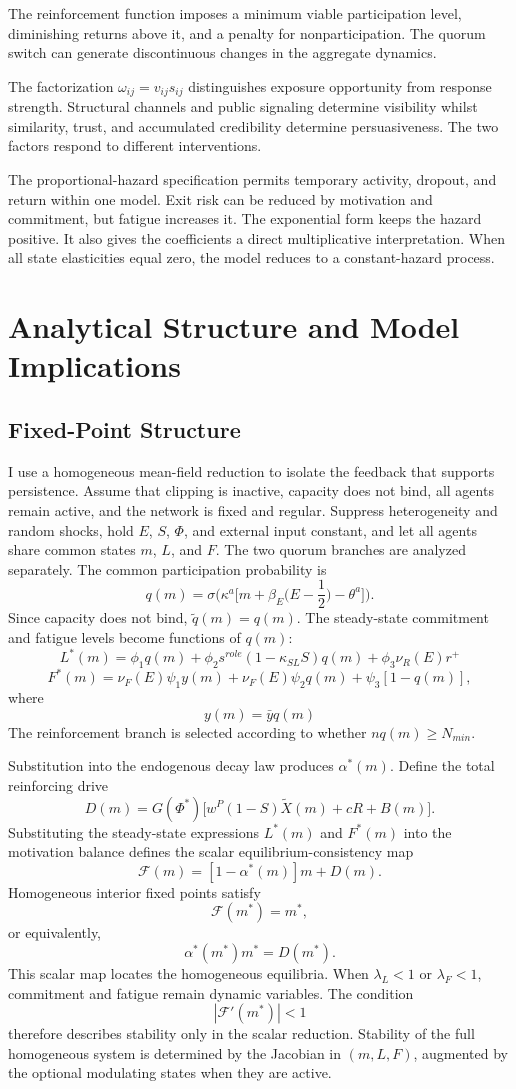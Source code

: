 \documentclass[11pt]{article}
\begin{document}
The reinforcement function imposes a minimum viable participation level, diminishing returns above it, and a penalty for nonparticipation.  The quorum switch can generate discontinuous changes in the aggregate dynamics. 

The factorization $\omega_{ij}=v_{ij}s_{ij}$ distinguishes exposure opportunity from response strength. Structural channels and public signaling determine visibility whilst similarity, trust, and accumulated credibility determine persuasiveness. The two factors respond to different interventions. 

The proportional-hazard specification permits temporary activity, dropout, and return within one model. Exit risk can be reduced by motivation and commitment, but fatigue increases it. The exponential form keeps the hazard positive. It also gives the coefficients a direct multiplicative interpretation. When all state elasticities equal zero, the model reduces to a constant-hazard process.

\section{Analytical Structure and Model Implications}
\subsection{Fixed-Point Structure}
I use a homogeneous mean-field reduction to isolate the feedback that supports persistence. Assume that clipping is inactive, capacity does not bind, all agents remain active, and the network is fixed and regular. Suppress heterogeneity and random shocks, hold $E$, $S$, $\Phi$, and external input constant, and let all agents share common states $m$, $L$, and $F$. The two quorum branches are analyzed separately. The common participation probability is 
\[
q(m)=\sigma\Bigg(\kappa^a\bigg[m+\beta_E\Big(E-\frac{1}{2}\Big)-\theta^a\bigg]\Bigg).
\]
Since capacity does not bind, $\tilde{q}(m)=q(m)$. The steady-state commitment and fatigue levels become functions of $q(m)$:
\[
L^*(m)=\phi_1q(m)+\phi_2s^{role}(1-\kappa_{SL}S)q(m)+\phi_3\nu_R(E)r^+
\]
\[
F^*(m)=\nu_F(E)\psi_1y(m)+\nu_F(E)\psi_2q(m)+\psi_3[1-q(m)],
\]
where
\[
y(m)=\bar{y}q(m)
\]
The reinforcement branch is selected according to whether $nq(m)\ge N_{min}$.

Substitution into the endogenous decay law produces $\alpha^*(m)$. Define the total reinforcing drive
\[
D(m)=G(\Phi^*)\Big[w^P(1-S)\widetilde{X}(m)+cR+B(m)\Big].
\]
Substituting the steady-state expressions $L^*(m)$ and $F^*(m)$ into the motivation balance defines the scalar equilibrium-consistency map
\[
\mathcal{F}(m)=[1-\alpha^*(m)]m+D(m).
\]
Homogeneous interior fixed points satisfy
\[\mathcal{F}(m^*)=m^*,\]
or equivalently,
\[
\alpha^*(m^*)m^*=D(m^*).
\]
This scalar map locates the homogeneous equilibria. 
When $\lambda_L<1$ or $\lambda_F<1$, commitment and fatigue remain dynamic variables. The condition
\[
|\mathcal{F}'(m^*)|<1
\]
therefore describes stability only in the scalar reduction. Stability of the full homogeneous system is determined by the Jacobian in $(m,L,F)$, augmented by the optional modulating states when they are active.
\end{document}
